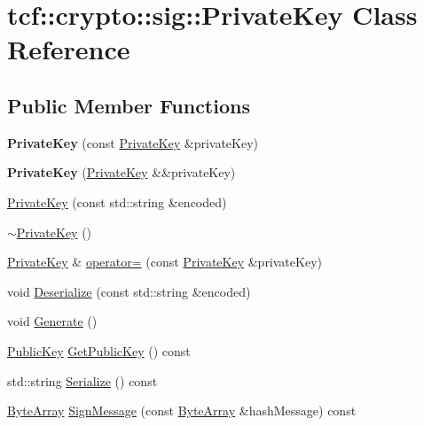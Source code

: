 \hypertarget{classtcf_1_1crypto_1_1sig_1_1PrivateKey}{}\section{tcf\+:\+:crypto\+:\+:sig\+:\+:Private\+Key Class Reference}
\label{classtcf_1_1crypto_1_1sig_1_1PrivateKey}
\subsection*{Public Member Functions}
\begin{DoxyCompactItemize}
\item 
\mbox{\label{classtcf_1_1crypto_1_1sig_1_1PrivateKey_a9df87e099d3257bad417facf4f96468f}} 
{\bfseries Private\+Key} (const \hyperlink{classtcf_1_1crypto_1_1sig_1_1PrivateKey}{Private\+Key} \&private\+Key)
\item 
\mbox{\label{classtcf_1_1crypto_1_1sig_1_1PrivateKey_aa6265e142bfcab27427fc490a268d774}} 
{\bfseries Private\+Key} (\hyperlink{classtcf_1_1crypto_1_1sig_1_1PrivateKey}{Private\+Key} \&\&private\+Key)
\item 
\hyperlink{classtcf_1_1crypto_1_1sig_1_1PrivateKey_a0d2fe71ed32c259f72b96e4539ee716a}{Private\+Key} (const std\+::string \&encoded)
\item 
\hyperlink{classtcf_1_1crypto_1_1sig_1_1PrivateKey_a67a33c66be0b2666d51614f92e2757ba}{$\sim$\+Private\+Key} ()
\item 
\hyperlink{classtcf_1_1crypto_1_1sig_1_1PrivateKey}{Private\+Key} \& \hyperlink{classtcf_1_1crypto_1_1sig_1_1PrivateKey_aaeca9d13bd64ab34188c363edcb53433}{operator=} (const \hyperlink{classtcf_1_1crypto_1_1sig_1_1PrivateKey}{Private\+Key} \&private\+Key)
\item 
void \hyperlink{classtcf_1_1crypto_1_1sig_1_1PrivateKey_aa2aedecf9f8a127447b9079710041759}{Deserialize} (const std\+::string \&encoded)
\item 
void \hyperlink{classtcf_1_1crypto_1_1sig_1_1PrivateKey_a869f91662055e93ea7cc5ed6d3c21423}{Generate} ()
\item 
\hyperlink{classtcf_1_1crypto_1_1sig_1_1PublicKey}{Public\+Key} \hyperlink{classtcf_1_1crypto_1_1sig_1_1PrivateKey_a410734270e37a888b335ea8d3901e981}{Get\+Public\+Key} () const
\item 
std\+::string \hyperlink{classtcf_1_1crypto_1_1sig_1_1PrivateKey_adf7cdfc64842e06e6e6de2cdee5c6a5a}{Serialize} () const
\item 
\hyperlink{types_8h_a35da937e2331acce98d47f44892f4a76}{Byte\+Array} \hyperlink{classtcf_1_1crypto_1_1sig_1_1PrivateKey_a294c33f936b4e737e273fed5efb4f20c}{Sign\+Message} (const \hyperlink{types_8h_a35da937e2331acce98d47f44892f4a76}{Byte\+Array} \&hash\+Message) const
\end{DoxyCompactItemize}


